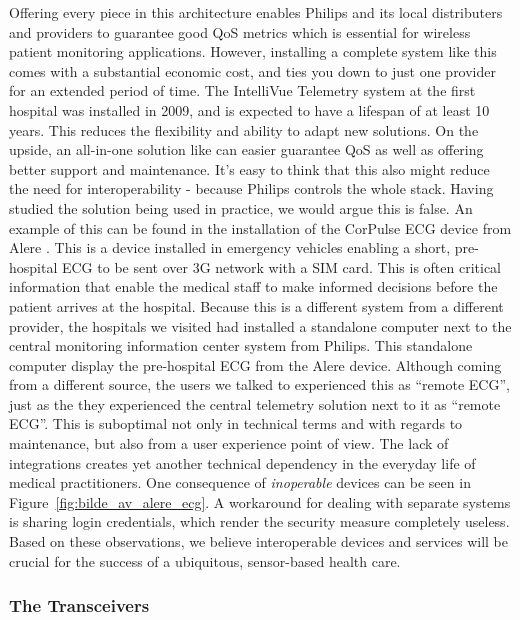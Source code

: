 Offering every piece in this architecture enables Philips and its local distributers and providers to guarantee good QoS metrics which is essential for wireless patient monitoring applications. However, installing a complete system like this comes with a substantial economic cost, and ties you down to just one provider for an extended period of time. The IntelliVue Telemetry system at the first hospital was installed in 2009, and is expected to have a lifespan of at least 10 years. This reduces the flexibility and ability to adapt new solutions. On the upside, an all-in-one solution like can easier guarantee QoS as well as offering better support and maintenance. It's easy to think that this also might reduce the need for interoperability - because Philips controls the whole stack. Having studied the solution being used in practice, we would argue this is false. An example of this can be found in the installation of the CorPulse ECG device from Alere \cite{alere}. This is a device installed in emergency vehicles enabling a short, pre-hospital ECG to be sent over 3G network with a SIM card. This is often critical information that enable the medical staff to make informed decisions before the patient arrives at the hospital. Because this is a different system from a different provider, the hospitals we visited had installed a standalone computer next to the central monitoring information center system from Philips. This standalone computer display the pre-hospital ECG from the Alere device. Although coming from a different source, the users we talked to experienced this as ``remote ECG'', just as the they experienced the central telemetry solution next to it as ``remote ECG''. This is suboptimal not only in technical terms and with regards to maintenance, but also from a user experience point of view. The lack of integrations creates yet another technical dependency in the everyday life of medical practitioners. One consequence of \emph{inoperable} devices can be seen in Figure~\ref{fig:bilde_av_alere_ecg}. A workaround for dealing with separate systems is sharing login credentials, which render the security measure completely useless. Based on these observations, we believe interoperable devices and services will be crucial for the success of a ubiquitous, sensor-based health care.


\subsubsection{The Transceivers} %
\label{ssub:the_transceivers}

